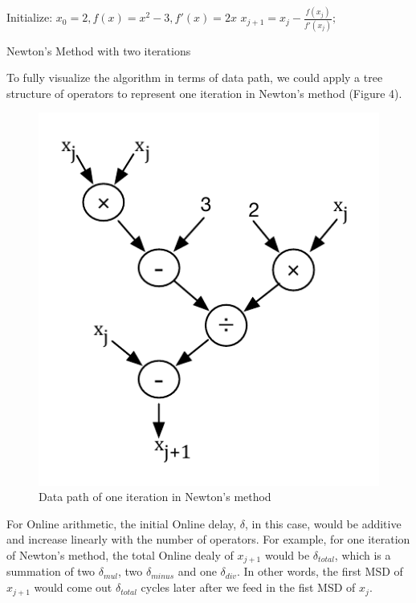 \documentclass{sig-alternate}
\begin{document}
  	\begin{algorithm}
  		\begin{algorithmic}[1]
  			\State Initialize: $x_{0}=2, f(x)=x^{2}-3, f'(x)=2x$	
  			\State $x_{j+1}=x_{j}-\frac{f(x_j)}{f'(x_j)};$
  			\EndFor
  		\end{algorithmic}
  		\caption{Newton's Method with two iterations}
  		\label{alg:algorithm3}
  	\end{algorithm}
To fully visualize the algorithm in terms of data path, we could apply a tree structure of operators to represent one iteration in Newton's method (Figure 4).  
\vspace{-8pt}
\begin{figure} [ht]
	\centering
	\includegraphics[scale=0.5]{parsing_tree}
	\caption{Data path of one iteration in Newton's method}
\end{figure}
\vspace{-8pt}

For Online arithmetic, the initial Online delay, $\delta$, in this case, would be additive and increase linearly with the number of operators. For example, for one iteration of Newton's method, the total Online dealy of $x_{j+1}$ would be $\delta_{total}$, which is a summation of two $\delta_{mul}$, two $\delta_{minus}$ and one $\delta_{div}$. In other words, the first MSD of $x_{j+1}$ would come out $\delta_{total}$ cycles later after we feed in the fist MSD of $x_{j}$.
\end{document}
